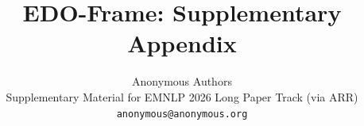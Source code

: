 \documentclass[11pt]{article}
\title{EDO-Frame: Supplementary Appendix}
\author{Anonymous Authors \\
  Supplementary Material for EMNLP 2026 Long Paper Track (via ARR) \\
  \texttt{anonymous@anonymous.org}}
\begin{document}
\maketitle
\sloppy




\end{document}
